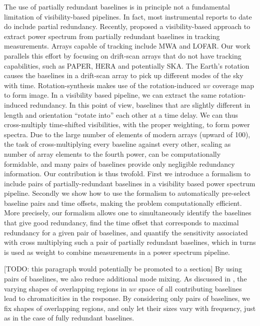 \documentclass[twocolumn,apj,numberedappendix]{emulateapj}
\renewcommand\[{\begin{equation}}
\renewcommand\]{\end{equation}}
\begin{document}
The use of partially redundant baselines is in principle not a fundamental limitation of visibility-based pipelines. In fact, most instrumental reports to date do include partial redundancy. Recently, \cite{wterm} proposed a visibility-based approach to extract power spectrum from partially redundant baselines in tracking measurements. Arrays capable of tracking include MWA and LOFAR. Our work parallels this effort by focusing on drift-scan arrays that do not have tracking capabilities, such as PAPER, HERA and potentially SKA.
The Earth's rotation causes the baselines in a drift-scan array to pick up different modes of the sky with time. Rotation-synthesis makes use of the rotation-induced $uv$ coverage map to form image. In a visibility based pipeline, we can extract the same rotation-induced redundancy. In this point of view, baselines that are slightly different in length and orientation
``rotate into'' each other at a time delay. We can thus cross-multiply time-shifted visibilities, with the proper weighting, to form power spectra.  Due to the large number of elements of modern arrays (upward of 100), the task of cross-multiplying every baseline against every other, scaling as number of array elements to the fourth power, can be computationally formidable, and many pairs of baselines provide only negligible redundancy information. Our contribution is thus twofold. First we introduce a formalism to include pairs of partially-redundant baselines in a visibility based power spectrum pipeline. Secondly we show how to use the formalism to automatically pre-select baseline pairs and time offsets, making the problem computationally efficient. More precisely, our formalism allows one to simultaneously identify the baselines that give good
redundancy, find the time offset that corresponds to maximal redundancy for a given pair of baselines, and quantify the sensitivity associated with cross multiplying
such a pair of partially redundant baselines, which in turns is used as weight to combine measurements in a power spectrum pipeline. 

[TODO: this paragraph would potentially be promoted to a section] By using pairs of baselines, we also reduce additional mode mixing. As discussed in \cite{Hazelton2013}, the varying shapes of overlapping regions in $uv$ space of all contributing baselines lead to chromaticities in the response. By considering only pairs of baselines, we fix shapes of overlapping regions, and only let their sizes vary with frequency, just as in the case of fully redundant baselines.  
\end{document}
